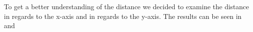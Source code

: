 To get a better understanding of the distance we decided to examine the distance in regards to the x-axis and in regards to the y-axis.
The results can be seen in  and 


